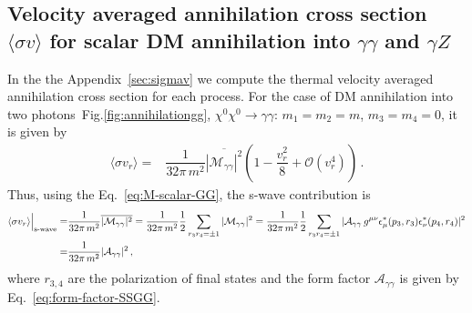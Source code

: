 \subsection{Velocity averaged annihilation cross section $\langle \sigma v \rangle$ for scalar DM annihilation into $\gamma\gamma$ and $\gamma Z$}

In the the Appendix~\ref{sec:sigmav} we compute the thermal velocity averaged annihilation cross section for each process.
For the case of DM annihilation into two photons~Fig.\ref{fig:annihilationgg}, $\chi^0\chi^0\rightarrow\gamma\gamma$: $m_1=m_2=m$, $m_3=m_4=0$, it is given by
%
\begin{align}
\langle\sigma v_r\rangle=&\dfrac{1}{32\pi\, m^2}\overline{{|\mathcal{M}_{\gamma\gamma}|^2}}\left(1-\dfrac{v_r^2}{8}+\mathcal{O}(v_r^4)\right)\,.
\end{align}
Thus, using the Eq.~\eqref{eq:M-scalar-GG}, the s-wave contribution is
\begin{align}
\langle\sigma v_r\rangle\Big{\vert}_{\text{s-wave}}
=&\dfrac{1}{32\pi\, m^2}\overline{{|\mathcal{M}_{\gamma\gamma}|^2}}
=\dfrac{1}{32\pi\, m^2}\dfrac{1}{2}\sum_{r_3r_4=\pm 1}{|\mathcal{M}_{\gamma\gamma}|^2}
=\dfrac{1}{32\pi\, m^2}\dfrac{1}{2}\sum_{r_3r_4=\pm 1} |\mathcal{A}_{\gamma\gamma}\,g^{\mu\nu}\epsilon_{\mu}^*(p_3,r_3)\epsilon_{\nu}^*(p_4,r_4)|^2\nonumber \\
=&\dfrac{1}{32\pi\, m^2} |\mathcal{A}_{\gamma\gamma}|^2 \,,
\end{align}
%
where $r_{3,4}$ are the polarization of final states and the form factor $\mathcal{A}_{\gamma\gamma}$ is given by Eq.~\ref{eq:form-factor-SSGG}.

